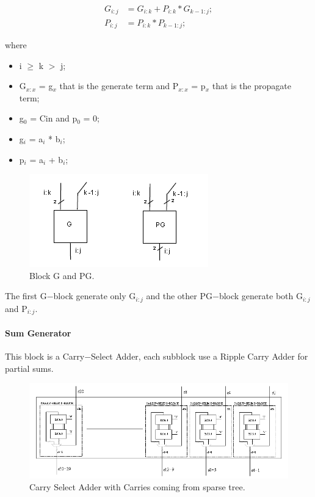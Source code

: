 \begin{align}
	G_{i:j} &= G_{i:k} + P_{i:k} * G_{k-1:j};\\
	P_{i:j} &= P_{i:k} * P_{k-1:j};
\label{General P and G}
\end{align}
	
where

\begin{itemize}
\item  i $\ge$ k $>$ j;
\item G$_{x:x}$ = g$_{x}$ that is the generate term and P$_{x:x}$ = p$_{x}$ that is the propagate term;
\item g$_{0}$ = Cin and p$_{0}$ = 0;
\item g$_{i}$ = a$_{i}$ * b$_{i}$;
\item p$_{i}$ = a$_{i}$ + b$_{i}$;
\end{itemize}

\begin{figure}[h]
\centering
\includegraphics[scale = 0.5]{chapters/figures/ppgblocks} 
\caption{Block G and PG.}
\label{fig:gpgblocks}  %
\end{figure}

The first G$-$block generate only G$_{i:j}$ and the other PG$-$block generate both G$_{i:j}$ and P$_{i:j}$.

\paragraph{Sum Generator}

This block is a Carry$-$Select Adder, each subblock use a Ripple Carry Adder for partial sums. 

\begin{figure}[h]
\centering
\includegraphics[scale = 0.7]{chapters/figures/sumgen} 
\caption{Carry Select Adder with Carries coming from sparse tree.}
\label{fig:sumgen}  %
\end{figure}

